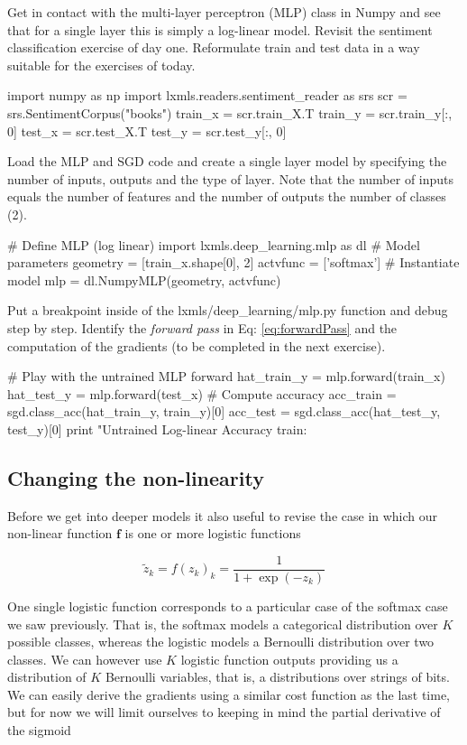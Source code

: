 \begin{exercise}
Get in contact with the multi-layer perceptron (MLP) class in Numpy and see
that for a single layer this is simply a log-linear model. Revisit the
sentiment classification exercise of day one. Reformulate train and test data
in a way suitable for the exercises of today.  
\begin{python}
import numpy as np
import lxmls.readers.sentiment_reader as srs  
scr     = srs.SentimentCorpus("books")
train_x = scr.train_X.T
train_y = scr.train_y[:, 0]
test_x  = scr.test_X.T
test_y  = scr.test_y[:, 0]
\end{python}
%
Load the MLP and SGD code and create a single layer model by specifying the
number of inputs, outputs and the type of layer. Note that the number of inputs
equals the number of features and the number of outputs the number of classes
(2).
%
\begin{python}
# Define MLP (log linear)
import lxmls.deep_learning.mlp as dl
# Model parameters
geometry = [train_x.shape[0], 2]
actvfunc = ['softmax']
# Instantiate model
mlp      = dl.NumpyMLP(geometry, actvfunc)
\end{python}
Put a breakpoint inside of the lxmls/deep\_learning/mlp.py function and debug
step by step. Identify the \textit{forward pass} in Eq: \ref{eq:forwardPass}
and the computation of the gradients (to be completed in the next exercise). 
\begin{python}
# Play with the untrained MLP forward
hat_train_y = mlp.forward(train_x) 
hat_test_y  = mlp.forward(test_x) 
# Compute accuracy
acc_train = sgd.class_acc(hat_train_y, train_y)[0]
acc_test  = sgd.class_acc(hat_test_y, test_y)[0]
print "Untrained Log-linear Accuracy train: %
\end{python}
\end{exercise}

\subsection{Changing the non-linearity}

Before we get into deeper models it also useful to revise the case in which our
non-linear function $\mathbf{f}$ is one or more logistic functions

\begin{equation}
\tilde{z}_k = f(z_k)_k = \frac{1}{1+\exp(-z_k)} 
\label{eq:sigmoid}
\end{equation}

One single logistic function corresponds to a particular case of the softmax
case we saw previously. That is, the softmax models a categorical distribution
over $K$ possible classes, whereas the logistic models a Bernoulli distribution
over two classes. We can however use $K$ logistic function outputs providing us
a distribution of $K$ Bernoulli variables, that is, a distributions over
strings of bits. We can easily derive the gradients using a similar cost
function as the last time, but for now we will limit ourselves to keeping in
mind the partial derivative of the sigmoid 


